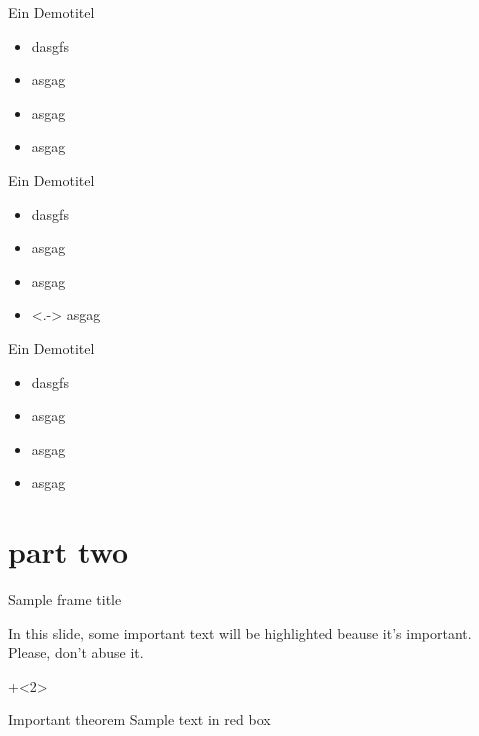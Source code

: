 \documentclass[11pt,aspectratio=1610]{beamer}	%
\begin{document}
\begin{frame}[<+->]{Ein Demotitel}{}
	\begin{itemize}
		\item<1-> dasgfs
		\item<2> asgag
		\item<3-> asgag
		\item asgag
	\end{itemize}
\end{frame}

\begin{frame}[<+->]{Ein Demotitel}{}
	\begin{itemize}
		\item dasgfs
		\item asgag
		\item asgag
		\item<.-> asgag
	\end{itemize}
\end{frame}

\begin{frame}{Ein Demotitel}{}
	\begin{itemize}
		\item<+-> dasgfs
		\item<+-> asgag
		\item<+-> asgag
		\item<+-> asgag
	\end{itemize}
\end{frame}

\section{part two}

\begin{frame}[t]{Sample frame title}{}
	
	In this slide, some important text will be
	\alert<2->{highlighted} beause it's important.
	Please, don't abuse it.
	
	
	
	\onslide+<2>{	%
	\begin{alertblock}{Important theorem}
	Sample text in red box
	\end{alertblock}
	}
	
\end{frame}
\end{document}
